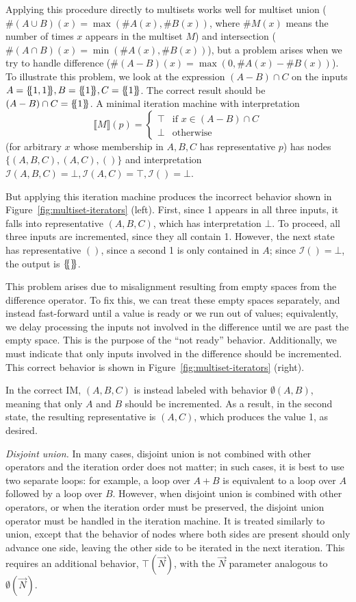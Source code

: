 \documentclass[acmsmall,screen,nonacm]{acmart}\settopmatter{printfolios=true,printccs=false,printacmref=false}
\newcommand*{\lB}{\{\mskip-5mu\{}
\newcommand*{\rB}{\}\mskip-5mu\}}
\newcommand*{\interp}{\mathcal{I}}
\begin{document}
Applying this procedure directly to multisets works well for
multiset union ($\#(A \cup B)(x) = \max(\#A(x), \#B(x))$,
where $\#M(x)$ means the number of times $x$ appears in the multiset $M$) and
intersection ($\#(A \cap B)(x) = \min(\#A(x), \#B(x))$), but a problem
arises when we try to handle difference ($\#(A - B)(x) = \max(0,
\#A(x) - \#B(x))$).
To illustrate this problem, we look at the expression $(A - B) \cap C$
on the inputs $A = \lB 1, 1 \rB, B = \lB 1 \rB, C = \lB 1 \rB$.
The correct result should be $(A - B) \cap C = \lB 1 \rB$.
A minimal iteration machine with interpretation
\[
    \lBrack M \rBrack(p) = \begin{cases}
        \top & \text{if } x \in (A - B) \cap C \\
        \bot & \text{otherwise}
    \end{cases}
\] (for arbitrary $x$
whose membership in $A, B, C$ has representative $p$)
has nodes $\{ (A, B, C), (A, C), () \}$ and interpretation
$\interp(A, B, C) = \bot, \interp(A, C) = \top, \interp() = \bot$.

But applying this iteration machine produces the incorrect behavior shown in Figure~\ref{fig:multiset-iterators} (left).
First, since 1 appears in all three inputs, it falls into
representative $(A, B, C)$, which has interpretation $\bot$.
To proceed, all three inputs are incremented, since they all contain
1. However, the next state has representative $()$, since a second 1
is only contained in $A$; since $\interp() = \bot$,
the output is $\lB \rB$.

This problem arises due to misalignment resulting from empty spaces
from the difference operator.
To fix this, we can treat these empty spaces separately, and instead
fast-forward until a value is ready or we run out of values;
equivalently, we delay processing the inputs not involved in the
difference until we are past the empty space.
This is the purpose of the ``not ready'' behavior. Additionally,
we must indicate that only inputs involved in the difference should
be incremented. This correct behavior is shown in Figure~\ref{fig:multiset-iterators} (right).

In the correct IM, $(A, B, C)$ is instead labeled with behavior
$\emptyset(A, B)$, meaning that only $A$ and $B$ should be incremented.
As a result, in the second state, the resulting representative is
$(A, C)$, which produces the value 1, as desired.

\emph{Disjoint union.}
In many cases, disjoint union is not combined with other operators and the iteration order does not matter; in such cases, it is best to use two separate loops: for example, a loop over $A + B$ is equivalent to a loop over $A$ followed by a loop over $B$. However, when disjoint union is combined with other operators, or when the iteration order must be preserved, the disjoint union operator must be handled in the iteration machine. It is treated similarly to union, except that the behavior of nodes where both sides are present should only advance one side, leaving the other side to be iterated in the next iteration. This requires an additional behavior, $\top(\vec{N})$, with the $\vec{N}$ parameter analogous to $\emptyset(\vec{N})$.
\end{document}
